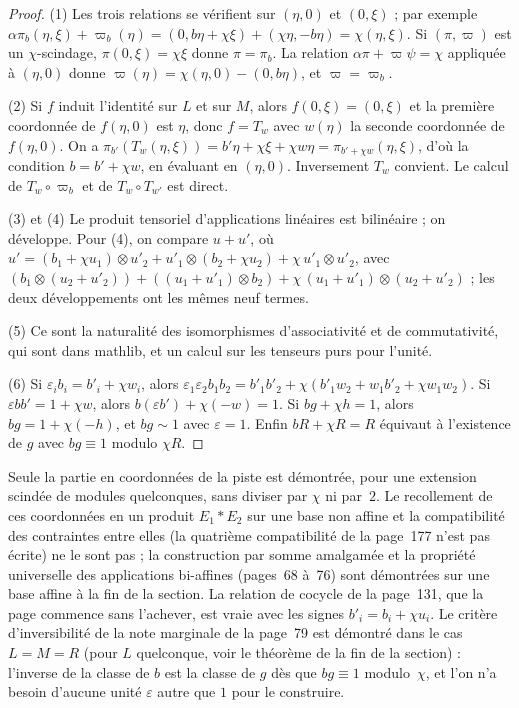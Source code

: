 \begin{proof}
(1) Les trois relations se vérifient sur $(\eta, 0)$ et $(0, \xi)$ ; par exemple $\alpha\pi_b(\eta, \xi) + \varpi_b(\eta) = (0, b\eta + \chi\xi) + (\chi\eta, -b\eta) = \chi(\eta, \xi)$. Si $(\pi, \varpi)$ est un $\chi$-scindage, $\pi(0, \xi) = \chi\xi$ donne $\pi = \pi_b$. La relation $\alpha\pi + \varpi\psi = \chi$ appliquée à $(\eta, 0)$ donne $\varpi(\eta) = \chi(\eta, 0) - (0, b\eta)$, et $\varpi = \varpi_b$.

(2) Si $f$ induit l'identité sur $L$ et sur $M$, alors $f(0, \xi) = (0, \xi)$ et la première coordonnée de $f(\eta, 0)$ est $\eta$, donc $f = T_w$ avec $w(\eta)$ la seconde coordonnée de $f(\eta, 0)$. On a $\pi_{b'}(T_w(\eta, \xi)) = b'\eta + \chi\xi + \chi w\eta = \pi_{b' + \chi w}(\eta, \xi)$, d'où la condition $b = b' + \chi w$, en évaluant en $(\eta, 0)$. Inversement $T_w$ convient. Le calcul de $T_w \circ \varpi_b$ et de $T_w \circ T_{w'}$ est direct.

(3) et (4) Le produit tensoriel d'applications linéaires est bilinéaire ; on développe. Pour (4), on compare $u + u'$, où $u' = (b_1 + \chi u_1) \otimes u'_2 + u'_1 \otimes (b_2 + \chi u_2) + \chi\, u'_1 \otimes u'_2$, avec $(b_1 \otimes (u_2 + u'_2)) + ((u_1 + u'_1) \otimes b_2) + \chi\,(u_1 + u'_1) \otimes (u_2 + u'_2)$ ; les deux développements ont les mêmes neuf termes.

(5) Ce sont la naturalité des isomorphismes d'associativité et de commutativité, qui sont dans mathlib, et un calcul sur les tenseurs purs pour l'unité.

(6) Si $\varepsilon_i b_i = b'_i + \chi w_i$, alors $\varepsilon_1\varepsilon_2 b_1b_2 = b'_1b'_2 + \chi(b'_1w_2 + w_1b'_2 + \chi w_1w_2)$. Si $\varepsilon bb' = 1 + \chi w$, alors $b(\varepsilon b') + \chi(-w) = 1$. Si $bg + \chi h = 1$, alors $bg = 1 + \chi(-h)$, et $bg \sim 1$ avec $\varepsilon = 1$. Enfin $bR + \chi R = R$ équivaut à l'existence de $g$ avec $bg \equiv 1$ modulo $\chi R$.
\end{proof}

\begin{remarque}
Seule la partie en coordonnées de la piste est démontrée, pour une extension scindée de modules quelconques, sans diviser par $\chi$ ni par~$2$. Le recollement de ces coordonnées en un produit $E_1 * E_2$ sur une base non affine et la compatibilité des contraintes entre elles (la quatrième compatibilité de la page~177 n'est pas écrite) ne le sont pas ; la construction par somme amalgamée et la propriété universelle des applications bi-affines (pages~68 à~76) sont démontrées sur une base affine à la fin de la section. La relation de cocycle de la page~131, que la page commence sans l'achever, est vraie avec les signes $b'_i = b_i + \chi u_i$. Le critère d'inversibilité de la note marginale de la page~79 est démontré dans le cas $L = M = R$ (pour $L$ quelconque, voir le théorème de la fin de la section) : l'inverse de la classe de $b$ est la classe de $g$ dès que $bg \equiv 1$ modulo~$\chi$, et l'on n'a besoin d'aucune unité $\varepsilon$ autre que $1$ pour le construire.
\end{remarque}

